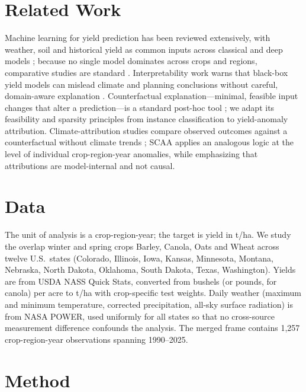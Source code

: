 \documentclass[11pt]{article}
\begin{document}
\section{Related Work}
\label{sec:related}
Machine learning for yield prediction has been reviewed extensively, with weather,
soil and historical yield as common inputs across classical and deep models
\citep{vanKlompenburg2020CropYieldReview,Meghraoui2024DLReview,Jabed2024Comprehensive};
because no single model dominates across crops and regions, comparative studies are
standard \citep{Iniyan2023Techniques,Mahesh2024Gradient}. Interpretability work warns
that black-box yield models can mislead climate and planning conclusions without
careful, domain-aware explanation \citep{Hu2023ExplainableYield,Mohan2025AIXAI}.
Counterfactual explanation---minimal, feasible input changes that alter a
prediction---is a standard post-hoc tool \citep{Mothilal2020DiCE}; we adapt its
feasibility and sparsity principles from instance classification to yield-anomaly
attribution. Climate-attribution studies compare observed outcomes against a
counterfactual without climate trends \citep{Lobell2011ClimateTrends}; SCAA applies an
analogous logic at the level of individual crop-region-year anomalies, while
emphasizing that attributions are model-internal and not causal.

\section{Data}
\label{sec:data}
The unit of analysis is a crop-region-year; the target is yield in t/ha. We study the
overlap winter and spring crops Barley, Canola, Oats and Wheat across twelve U.S.\
states (Colorado, Illinois, Iowa, Kansas, Minnesota, Montana, Nebraska, North Dakota,
Oklahoma, South Dakota, Texas, Washington). Yields are from USDA NASS Quick Stats,
converted from bushels (or pounds, for canola) per acre to t/ha with crop-specific
test weights. Daily weather (maximum and minimum temperature, corrected precipitation,
all-sky surface radiation) is from NASA POWER, used uniformly for all states so that no
cross-source measurement difference confounds the analysis. The merged frame contains
1{,}257 crop-region-year observations spanning 1990--2025.

\section{Method}
\label{sec:method}
\end{document}
